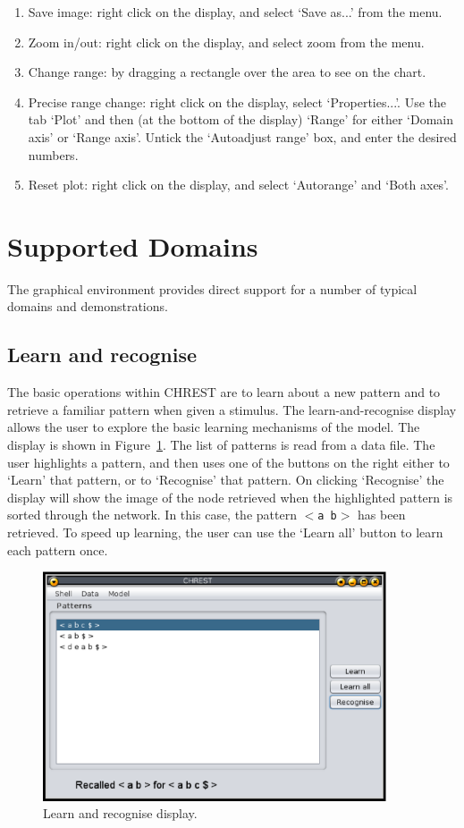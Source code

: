 \documentclass{article}
\begin{document}
\begin{enumerate}
\item Save image: right click on the display, and select `Save as...' from the menu.
\item Zoom in/out: right click on the display, and select zoom from the menu.
\item Change range: by dragging a rectangle over the area to see on the chart.
\item Precise range change: right click on the display, select `Properties...'.  Use the 
tab `Plot' and then (at the bottom of the display) `Range' for either `Domain axis' or `Range 
axis'.  Untick the `Autoadjust range' box, and enter the desired numbers.
\item Reset plot: right click on the display, and select `Autorange' and `Both axes'.
\end{enumerate}

\section{Supported Domains}

The graphical environment provides direct support for a number of typical 
domains and demonstrations.

\subsection{Learn and recognise}

The basic operations within CHREST are to learn about a new pattern and to
retrieve a familiar pattern when given a stimulus.  The learn-and-recognise
display allows the user to explore the basic learning mechanisms of the model.
The display is shown in Figure~\ref{learn-and-recognise}.  The list of patterns
is read from a data file.  The user highlights a pattern, and then uses one of
the buttons on the right either to `Learn' that pattern, or to `Recognise' that
pattern.  On clicking `Recognise' the display will show the image of the node
retrieved when the highlighted pattern is sorted through the network.  In this
case, the pattern {\tt $<$a b$>$} has been retrieved.  To speed up learning,
the user can use the `Learn all' button to learn each pattern once.  

\begin{figure}
\includegraphics[width=4.0in]{images/learn-and-recognise.eps}
\caption{Learn and recognise display.}
\label{learn-and-recognise}
\end{figure}
\end{document}
